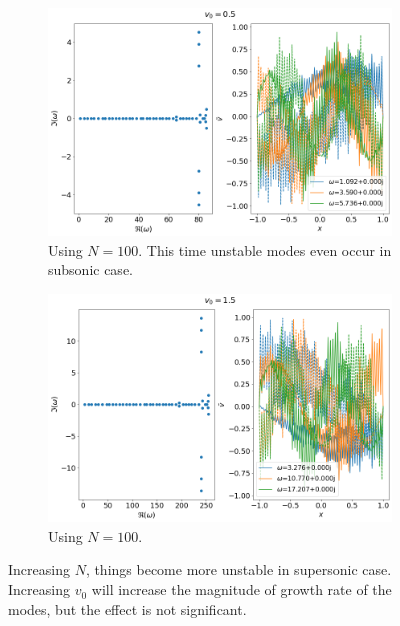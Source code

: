 \documentclass{article}
\begin{document}
\begin{figure}[H]
    \centering
    \begin{subfigure}[b]{0.45\linewidth}
        \includegraphics[width=\linewidth]{img/results-linear-N=100,v0=0.5.png}
        \caption{Using $N=100$. This time unstable modes even occur in subsonic case.}
    \end{subfigure}%
    \begin{subfigure}[b]{0.45\linewidth}
        \includegraphics[width=\linewidth]{img/results-linear-N=100,v0=1.5.png}
        \caption{Using $N=100$.}
    \end{subfigure}
    \caption{Increasing $N$, things become more unstable in supersonic case. Increasing $v_0$ will increase the magnitude of growth rate of the modes, but the effect is not significant.}
    \label{fig:results-linear-unstable}
\end{figure}
\end{document}
